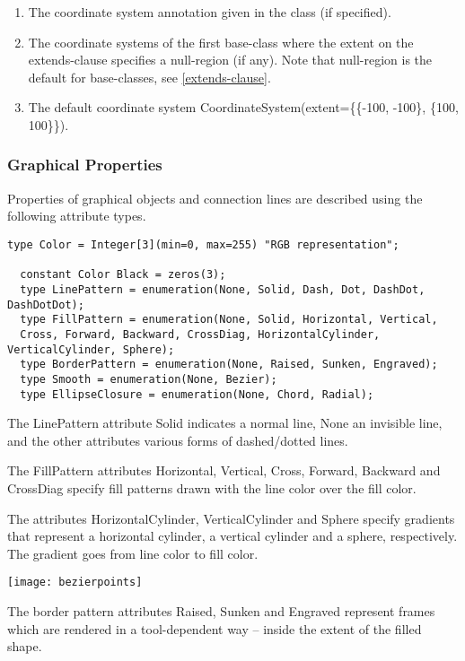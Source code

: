 \begin{enumerate}
\item
  The coordinate system annotation given in the class (if specified).
\item
  The coordinate systems of the first base-class where the extent on the
  extends-clause specifies a null-region (if any). Note that null-region
  is the default for base-classes, see \ref{extends-clause}.
\item
  The default coordinate system CoordinateSystem(extent=\{\{-100,
  -100\}, \{100, 100\}\}).
\end{enumerate}

\subsubsection{Graphical Properties}

Properties of graphical objects and connection lines are described using
the following attribute types.

\begin{lstlisting}[language=modelica]
  type Color = Integer[3](min=0, max=255) "RGB representation";

  constant Color Black = zeros(3);
  type LinePattern = enumeration(None, Solid, Dash, Dot, DashDot, DashDotDot);
  type FillPattern = enumeration(None, Solid, Horizontal, Vertical,
  Cross, Forward, Backward, CrossDiag, HorizontalCylinder, VerticalCylinder, Sphere);
  type BorderPattern = enumeration(None, Raised, Sunken, Engraved);
  type Smooth = enumeration(None, Bezier);
  type EllipseClosure = enumeration(None, Chord, Radial);
\end{lstlisting}
The LinePattern attribute Solid indicates a normal line, None an
invisible line, and the other attributes various forms of dashed/dotted
lines.

The FillPattern attributes Horizontal, Vertical, Cross, Forward,
Backward and CrossDiag specify fill patterns drawn with the line color
over the fill color.

The attributes HorizontalCylinder, VerticalCylinder and Sphere specify
gradients that represent a horizontal cylinder, a vertical cylinder and
a sphere, respectively. The gradient goes from line color to fill color.

\texttt{[image: bezierpoints]}

The border pattern attributes Raised, Sunken and Engraved represent frames
which are rendered in a tool-dependent way -- inside the extent of the
filled shape.

